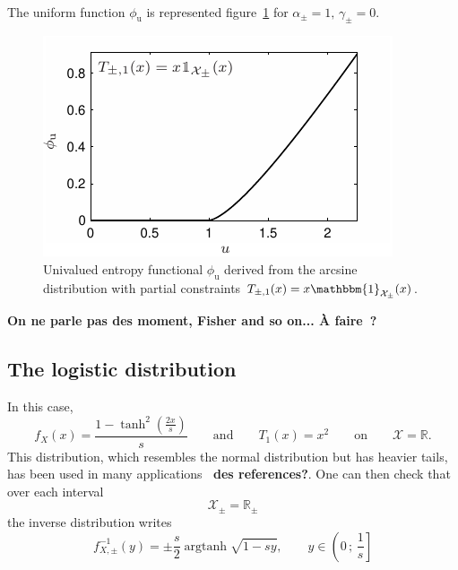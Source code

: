 \documentclass[entropy,article,submit,moreauthors,pdftex]{Definitions/mdpi}
\newcommand{\SZ}[1]{{\color{blue} #1}}                                       %
\newcommand{\jfb}[1]{{\color{red} #1}}                                       %
\newcommand{\Avoir}[1]{{\color{red}\bf #1}}                                  %
\def\Rset{\mathbb{R}}%
\def\X{\mathcal{X}}%
\def\un{\mathbbm{1}}%
\def\argtanh{\operatorname{argtanh}}%
\def\u{\mathrm{u}}
\begin{document}
\

The  uniform function  $\phi_\u$ is  represented figure~\ref{fig:Entropy-arcsin}
for $\alpha_\pm = 1, \, \gamma_\pm = 0$.
 
\begin{figure}[htbp]
  \begin{minipage}{.6\columnwidth}
    \centerline{\includegraphics[width=.9\textwidth]{PDF/MaxEnt_ArcsineLaw}}
  \end{minipage}
  \begin{minipage}{.4\columnwidth}
\caption{\SZ{Univalued e}ntropy  functional   $\phi_\u$  derived  from   the  arcsine
  distribution with partial constraints $T_{\pm,1}(x) = x \un_{\X_\pm}(x)$.}
\label{fig:Entropy-arcsin}
  \end{minipage}
\end{figure}

\Avoir{On ne parle pas des moment, Fisher and so on... \`A faire~?}



\subsection{The logistic distribution}
\label{subsecapp:Logistic}

In this case, \SZ{
%
\[
f_X(x)  = \frac{1  -  \tanh^2\left(\frac{2 x}{s}\right)}{s} \qquad  \mbox{and}
\qquad T_1(x) = x^2 \qquad \mbox{on} \qquad \X = \Rset.
\]
}
This  distribution, which  resembles  the normal  distribution  but has  heavier
tails,   has    been   used   in   many    applications~\Avoir{\cite{toto}   des
  references?}. One can then check that over each interval
%
\[
\X_\pm = \Rset_\pm
\]
%
the inverse distribution writes \SZ{
%
\[
f_{X,\pm}^{-1}(y) = \pm \frac{s}{2} \argtanh \sqrt{1 - s y}, \qquad y \in \left( 0 \, ; \,
  \frac{1}{s} \right]
\]
}
\end{document}
